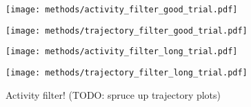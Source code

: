 \documentclass[../main.tex]{subfiles}
\begin{document}
\begin{figure}[tph]
  \begin{minipage}[b]{0.7\linewidth}
    \centering
    \texttt{[image: methods/activity\_filter\_good\_trial.pdf]}
    \subcaption{}
    \vspace{4ex}
  \end{minipage}%
  \begin{minipage}[b]{0.3\linewidth}
    \centering
    \texttt{[image: methods/trajectory\_filter\_good\_trial.pdf]}
    \subcaption{}
    \vspace{4ex}
  \end{minipage}
  \begin{minipage}[b]{0.7\linewidth}
    \centering
    \texttt{[image: methods/activity\_filter\_long\_trial.pdf]}
    \subcaption{}
    \vspace{4ex}
  \end{minipage}%
  \begin{minipage}[b]{0.3\linewidth}
    \centering
    \texttt{[image: methods/trajectory\_filter\_long\_trial.pdf]}
    \subcaption{}
    \vspace{4ex}
  \end{minipage}
  \caption[Activity filter for EMG and trajectories]{Activity filter! (TODO: spruce up trajectory plots)}\label{fig:activity_filter}
\end{figure}






\end{document}
